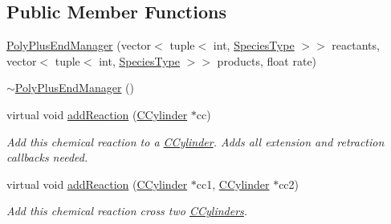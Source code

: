 \subsection*{Public Member Functions}
\begin{DoxyCompactItemize}
\item 
\hyperlink{classPolyPlusEndManager_a1d8112a3c942f81702b2e9d0c580f792}{Poly\+Plus\+End\+Manager} (vector$<$ tuple$<$ int, \hyperlink{Species_8h_a50651af47c56ea0e27235468d23542cf}{Species\+Type} $>$$>$ reactants, vector$<$ tuple$<$ int, \hyperlink{Species_8h_a50651af47c56ea0e27235468d23542cf}{Species\+Type} $>$$>$ products, float rate)
\item 
\hyperlink{classPolyPlusEndManager_a13ea4cecd6e8b72a30b56f996792ca72}{$\sim$\+Poly\+Plus\+End\+Manager} ()
\item 
virtual void \hyperlink{classPolyPlusEndManager_a735f37d5d635849af7ea522798e4384f}{add\+Reaction} (\hyperlink{classCCylinder}{C\+Cylinder} $\ast$cc)
\begin{DoxyCompactList}\small\item\em Add this chemical reaction to a \hyperlink{classCCylinder}{C\+Cylinder}. Adds all extension and retraction callbacks needed. \end{DoxyCompactList}\item 
virtual void \hyperlink{classPolyPlusEndManager_ac5d5bf1e5971c9499d124692267e31b7}{add\+Reaction} (\hyperlink{classCCylinder}{C\+Cylinder} $\ast$cc1, \hyperlink{classCCylinder}{C\+Cylinder} $\ast$cc2)
\begin{DoxyCompactList}\small\item\em Add this chemical reaction cross two \hyperlink{classCCylinder}{C\+Cylinders}. \end{DoxyCompactList}\end{DoxyCompactItemize}
